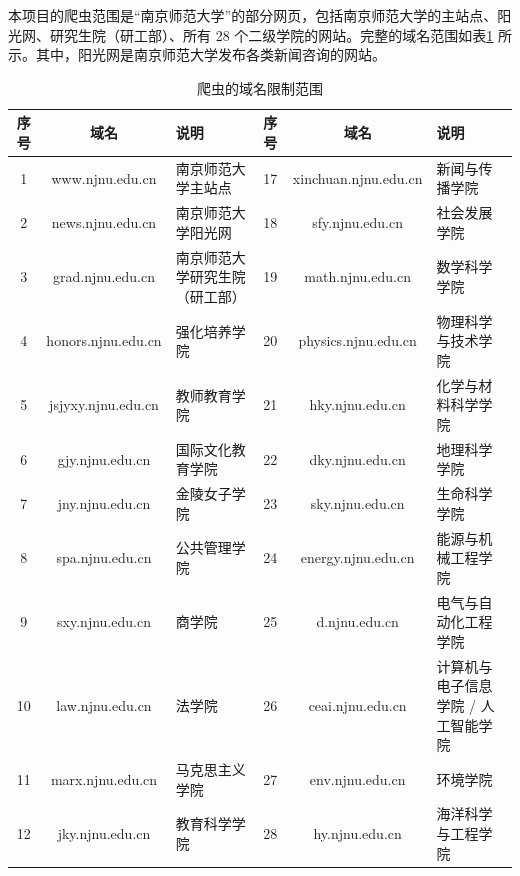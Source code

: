 \documentclass{ctexart}
\begin{document}
    本项目的爬虫范围是“南京师范大学”的部分网页，包括南京师范大学的主站点、阳光网、研究生院（研工部）、所有 28 个二级学院的网站。完整的域名范围如表\ref{tab:crawl_domains} 所示。其中，阳光网是南京师范大学发布各类新闻咨询的网站。

    \begin{table}[h]
        \centering
        \caption{爬虫的域名限制范围}
        \label{tab:crawl_domains}
        \scriptsize{
            \begin{tabular}{ccl|ccl}
                \hline
                序号 & 域名                 & 说明              & 序号 & 域名                   & 说明                  \\ \hline
                1  & www.njnu.edu.cn    & 南京师范大学主站点       & 17 & xinchuan.njnu.edu.cn & 新闻与传播学院             \\
                2  & news.njnu.edu.cn   & 南京师范大学阳光网       & 18 & sfy.njnu.edu.cn      & 社会发展学院              \\
                3  & grad.njnu.edu.cn   & 南京师范大学研究生院（研工部） & 19 & math.njnu.edu.cn     & 数学科学学院              \\
                4  & honors.njnu.edu.cn & 强化培养学院          & 20 & physics.njnu.edu.cn  & 物理科学与技术学院           \\
                5  & jsjyxy.njnu.edu.cn & 教师教育学院          & 21 & hky.njnu.edu.cn      & 化学与材料科学学院           \\
                6  & gjy.njnu.edu.cn    & 国际文化教育学院        & 22 & dky.njnu.edu.cn      & 地理科学学院              \\
                7  & jny.njnu.edu.cn    & 金陵女子学院          & 23 & sky.njnu.edu.cn      & 生命科学学院              \\
                8  & spa.njnu.edu.cn    & 公共管理学院          & 24 & energy.njnu.edu.cn   & 能源与机械工程学院           \\
                9  & sxy.njnu.edu.cn    & 商学院             & 25 & d.njnu.edu.cn        & 电气与自动化工程学院          \\
                10 & law.njnu.edu.cn    & 法学院             & 26 & ceai.njnu.edu.cn     & 计算机与电子信息学院 / 人工智能学院 \\
                11 & marx.njnu.edu.cn   & 马克思主义学院         & 27 & env.njnu.edu.cn      & 环境学院                \\
                12 & jky.njnu.edu.cn    & 教育科学学院          & 28 & hy.njnu.edu.cn       & 海洋科学与工程学院           \\

\end{tabular}}
\end{table}
\end{document}
